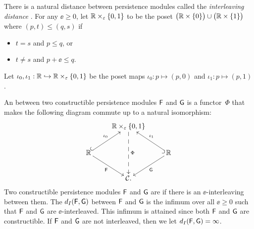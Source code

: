 \documentclass[12pt]{article}
\begin{document}
There is a natural distance between persistence modules called the \emph{interleaving
distance} \cite{proximity}.
For any $\ee \geq 0$, let ${\mathbb R} \times_\varepsilon \{ 0, 1\}$ to be the poset 
$\big(  {\mathbb R} \times \{0\} \big) \cup \big(  {\mathbb R} \times\{1\} \big)$
where $(p,t) \leq (q,s)$ if 
\begin{itemize}
\item $t=s$ and $p \leq q$, or
\item $t \neq s$ and $p + \ee \leq q$.
\end{itemize}
Let $\iota_0,\iota_1: {\mathbb R} \hookrightarrow  {\mathbb R} \times_\varepsilon \{ 0, 1\}$ be the poset maps
 $\iota_0: p \mapsto (p,0)$ and $\iota_1: p \mapsto(p,1)$.

\begin{defn}
\label{defn:interleaving}
An  between two constructible persistence modules 
${\mathsf{F}}$ and ${\mathsf{G}}$ is a functor~$\Phi$ that makes the following diagram commute 
up to a natural isomorphism:
\begin{equation}
\label{dgm:interleaving}
\begin{gathered}
\xymatrix{
&  \Rspace \times_\ee \{ 0, 1\} \ar@{-->}[dd]^{\Phi} \\
 \Rspace \ar@{^{(}->}[ru]^{\iota_0} \ar[rd]_{\Ffunc} &&  \Rspace \ar@{^{(}->}[lu]_{\iota_1} \ar[ld]^{\Gfunc} \\
& \mathcal{C}. &
}
\end{gathered}
\end{equation}
Two constructible persistence modules ${\mathsf{F}}$ and ${\mathsf{G}}$ are  if there is an 
$\ee$-interleaving between them. 
The  $d_I({\mathsf{F}},{\mathsf{G}})$ between ${\mathsf{F}}$ and ${\mathsf{G}}$ is the infimum 
over all $\ee\geq 0$ 
such that ${\mathsf{F}}$ and ${\mathsf{G}}$ are $\ee$-interleaved. 
This infimum is attained since both ${\mathsf{F}}$ and ${\mathsf{G}}$ are constructible.
If ${\mathsf{F}}$ and ${\mathsf{G}}$ are not interleaved, then we let $d_I({\mathsf{F}},{\mathsf{G}})=\infty$.
\end{defn}
\end{document}

